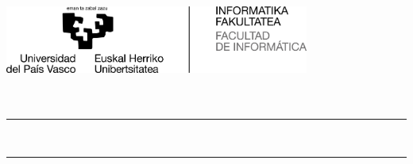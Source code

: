 \thispagestyle{empty}

\newcommand{\HRule}{\rule{\linewidth}{0.5mm}} 

\thispagestyle{empty}
\begin{center}
	
  \includegraphics[width=0.75\textwidth]{config/FacultadInformatica-Gipuzkoa-bilingue-positivo-alta.jpg} \\[2cm]
  
  
  {\LARGE {\malizenburua}\\[0.5cm]
  {\Large \ikasketak}}\\[2cm]
  
  
  \HRule \\[0.5cm]
  {\LARGE 
    \textbf{\izenburua}
  }
  \HRule \\[0.5cm]

  \Large \textsl{\egilea}\\
  
   
  \vfill
  
  \textbf{\zuzendariaktestua}\\
  \zuzendariak\\[2cm]
  
  \data

\end{center}
